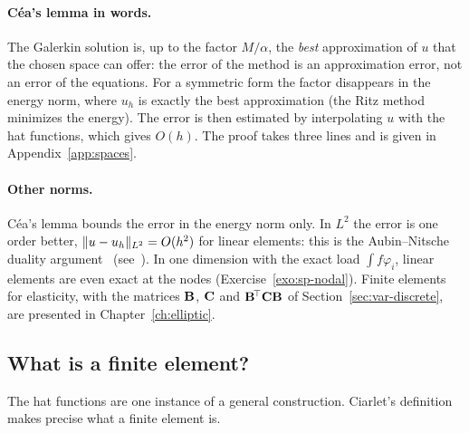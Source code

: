 \paragraph{C\'ea's lemma in words.} The Galerkin solution is, up to the factor
$M/\alpha$, the \emph{best} approximation of $u$ that the chosen space can
offer: the error of the method is an approximation error, not an error of
the equations. For a symmetric form the factor disappears in the energy
norm, where $u_h$ is exactly the best approximation (the Ritz method
minimizes the energy). The error is then estimated by interpolating $u$ with
the hat functions, which gives $O(h)$. The proof takes three lines and is
given in Appendix~\ref{app:spaces}.

\paragraph{Other norms.}
%
C\'ea's lemma bounds the error in the energy norm only. In $L^2$ the error is
one order better, $\lVert u-u_h\rVert_{L^2}=O(h^2)$ for linear elements: this is
the Aubin--Nitsche duality argument~\cite{Aubin1967,Nitsche1968}
(see~\cite{Ciarlet2002,BrennerScott2008}).
In one dimension with the exact load $\displaystyle \int f\varphi_i$, linear
elements are even exact at the nodes (Exercise~\ref{exo:sp-nodal}).
Finite elements for elasticity, with the matrices $\mathbf{B}$, $\mathbf{C}$ and
$\mathbf{B}^{\!\top}\mathbf{C}\mathbf{B}$ of Section~\ref{sec:var-discrete}, are presented in
Chapter~\ref{ch:elliptic}.

\subsection{What is a finite element?}\label{sec:var-ciarlet}
%
The hat functions are one instance of a general construction. Ciarlet's
definition~\cite{Ciarlet2002} makes precise what a finite element is.

